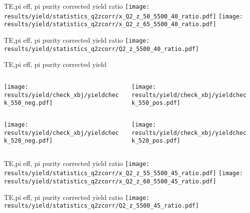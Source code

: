 \begin{frame}{TE,pi eff, pi purity corrected yield ratio}
\texttt{[image: results/yield/statistics\_q2zcorr/x\_Q2\_z\_50\_5500\_40\_ratio.pdf]}
\texttt{[image: results/yield/statistics\_q2zcorr/x\_Q2\_z\_65\_5500\_40\_ratio.pdf]}
\end{frame}
\begin{frame}{TE,pi eff, pi purity corrected yield ratio}
\texttt{[image: results/yield/statistics\_q2zcorr/Q2\_z\_5500\_40\_ratio.pdf]}
\end{frame}
\begin{frame}{TE,pi eff, pi purity corrected yield}
\begin{columns}
\begin{column}[T]{0.5\textwidth}
\texttt{[image: results/yield/check\_xbj/yieldcheck\_550\_neg.pdf]}
\end{column}
\begin{column}[T]{0.5\textwidth}
\texttt{[image: results/yield/check\_xbj/yieldcheck\_550\_pos.pdf]}
\end{column}
\end{columns}
\begin{columns}
\begin{column}[T]{0.5\textwidth}
\texttt{[image: results/yield/check\_xbj/yieldcheck\_520\_neg.pdf]}
\end{column}
\begin{column}[T]{0.5\textwidth}
\texttt{[image: results/yield/check\_xbj/yieldcheck\_520\_pos.pdf]}
\end{column}
\end{columns}
\end{frame}
\begin{frame}{TE,pi eff, pi purity corrected yield ratio}
\texttt{[image: results/yield/statistics\_q2zcorr/x\_Q2\_z\_55\_5500\_45\_ratio.pdf]}
\texttt{[image: results/yield/statistics\_q2zcorr/x\_Q2\_z\_60\_5500\_45\_ratio.pdf]}
\end{frame}
\begin{frame}{TE,pi eff, pi purity corrected yield ratio}
\texttt{[image: results/yield/statistics\_q2zcorr/Q2\_z\_5500\_45\_ratio.pdf]}
\end{frame}
